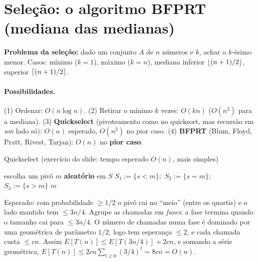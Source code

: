 \section{Seleção: o algoritmo BFPRT (mediana das medianas)}\label{sec:selecao}
\textbf{Problema da seleção:} dado um conjunto $A$ de $n$ números e $k$, achar o $k$-ésimo menor. Casos: mínimo ($k=1$), máximo ($k=n$), mediana inferior $\lfloor(n+1)/2\rfloor$, superior $\lceil(n+1)/2\rceil$.

\paragraph{Possibilidades.} (1) Ordenar: $O(n\log n)$. (2) Retirar o mínimo $k$ vezes: $O(kn)$ ($O(n^2)$ para a mediana). (3) \textbf{Quickselect} (pivoteamento como no quicksort, mas recursão em \emph{um} lado só): $O(n)$ esperado, $O(n^2)$ no pior caso. (4) \textbf{BFPRT} (Blum, Floyd, Pratt, Rivest, Tarjan): $O(n)$ no \textbf{pior caso}.

\begin{pseudo}{Quickselect (exercício do slide: tempo esperado $O(n)$, mais simples)}
\begin{algorithmic}
  \State escolha um pivô $m$ \textbf{aleatório} em $S$
  \State $S_1:=\{s<m\}$;\ $S_2:=\{s=m\}$;\ $S_3:=\{s>m\}$
   \State \Return {}
   \State \Return $m$
  \Else \State \Return {}
  \EndIf
\EndFunction
\end{algorithmic}
\end{pseudo}
Esperado: com probabilidade $\ge1/2$ o pivô cai no ``meio'' (entre os quartis) e o lado mantido tem $\le 3n/4$. Agrupe as chamadas em \emph{fases}: a fase termina quando o tamanho cai para $\le3n/4$. O número de chamadas numa fase é dominado por uma geométrica de parâmetro $1/2$, logo tem esperança $\le2$, e cada chamada custa $\le cn$. Assim $E[T(n)]\le E[T(3n/4)]+2cn$, e somando a série geométrica, $E[T(n)]\le 2cn\sum_{t\ge0}(3/4)^t=8cn=O(n)$.

